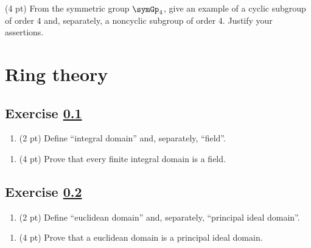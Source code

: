 
(4 pt) From the symmetric group $\symGp_{4}$, give an example of a cyclic subgroup of order $4$ and, separately, a noncyclic subgroup of order $4$. Justify your assertions.





%
%

\section*{Ring theory}



\subsection{Exercise \ref{sec : me00rtQ1}}
\label{sec : me00rtQ1}

\begin{enumerate}[label=(\alph*)]
\item\label{itm : me00rtQ1a} (2 pt) Define ``integral domain'' and, separately, ``field''.
\end{enumerate}

\spaceSolution{2in}{%
}%

\begin{enumerate}[resume, label=(\alph*)]
\item\label{itm : me00rtQ1b} (4 pt) Prove that every finite integral domain is a field.
\end{enumerate}

\spaceSolution{2.5in}{%
}%



\subsection{Exercise \ref{sec : me00rtQ2}}
\label{sec : me00rtQ2}

\begin{enumerate}[label=(\alph*)]
\item\label{itm : me00rtQ2a} (2 pt) Define ``euclidean domain'' and, separately, ``principal ideal domain''.
\end{enumerate}

\spaceSolution{2in}{%
}%

\begin{enumerate}[resume, label=(\alph*)]
\item\label{itm : me00rtQ2a} (4 pt) Prove that a euclidean domain is a principal ideal domain.
\end{enumerate}

